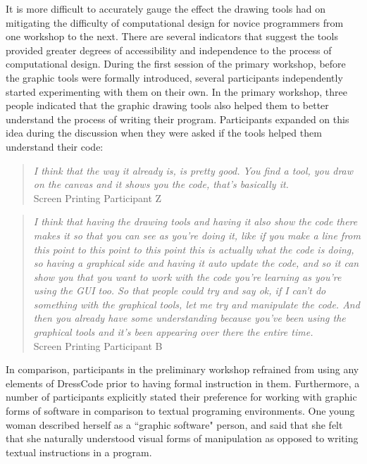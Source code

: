 \documentclass{sigchi}
\begin{document}
It is more difficult to accurately gauge the effect the drawing tools had on mitigating the difficulty of computational design for novice programmers from one workshop to the next. There are several indicators that suggest the tools provided greater degrees of accessibility and independence to the process of computational design. During the first session of the primary workshop, before the graphic tools were formally introduced, several participants independently started experimenting with them on their own. In the primary workshop, three people indicated that the graphic drawing tools also helped them to better understand the process of writing their program. Participants expanded on this idea during the discussion when they were asked if the tools helped them understand their code: 
\begin{quotation}
\textit{I think that the way it already is, is pretty good. You find a tool, you draw on the canvas and it shows you the code, that's basically it.}
\\Screen Printing Participant Z
\end{quotation}

\begin{quotation}
\textit{I think that having the drawing tools and having it also show the code there makes it so that you can see as you're doing it, like if you make a line from this point to this point to this point this is actually what the code is doing, so having a graphical side and having it auto update the code, and so it can show you that you want to work with the code you're learning as you're using the GUI too. So that people could try and say ok, if I can't do something with the graphical tools, let me try and manipulate the code. And then you already have some understanding because you've been using the graphical tools and it's been appearing over there the entire time.}
\\Screen Printing Participant B
\end{quotation}

In comparison, participants in the preliminary workshop refrained from using any elements of DressCode prior to having formal instruction in them. Furthermore, a number of participants explicitly stated their preference for working with graphic forms of software in comparison to textual programing environments. One young woman described herself as a ``graphic software" person, and said that she felt that she naturally understood visual forms of manipulation as opposed to writing textual instructions in a program. 
\end{document}
